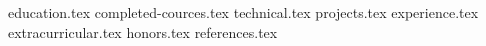 \documentclass[11pt, letterpaper]{awesome-cv}
\newcommand*{\sectiondir}{resume/}
\begin{document}
\makecvheader
\vspace{-4mm}
{education.tex}
{completed-cources.tex}
{technical.tex}
{projects.tex}
{experience.tex}
\pagebreak
{extracurricular.tex}
{honors.tex}
{references.tex}
\end{document}
